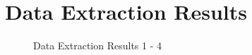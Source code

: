 \chapter{Data Extraction Results}
\label{appendix:DataExtraction}

\begin{figure}[h]
    \centering
    \caption{Data Extraction Results 1 - 4}
    \label{fig:DataExtraction_1_to_4}
\end{figure}
 
